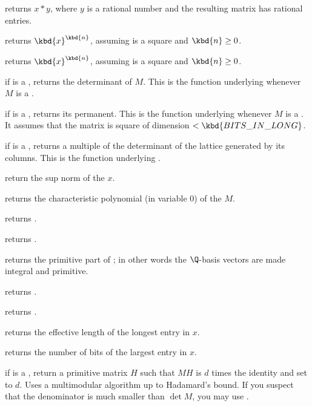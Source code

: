  returns $x*y$, where $y$ is a rational number
and the resulting matrix has rational entries.

 returns $\kbd{x}^\kbd{n}$, assuming 
is a square  and $\kbd{n}\geq 0$.

 returns $\kbd{x}^\kbd{n}$, assuming 
is a square  and $\kbd{n}\geq 0$.

 if  is a , returns the determinant of
$M$. This is the function underlying  whenever $M$ is a .

 if  is a , returns its
permanent. This is the function underlying  whenever $M$
is a . It assumes that the matrix is square of dimension $<
\kbd{BITS\_IN\_LONG}$.

 if  is a , returns a multiple of
the determinant of the lattice generated by its columns. This is the function
underlying .

 return the sup norm of the  $x$.

 returns the characteristic polynomial (in
variable $0$) of the  $M$.

 returns .

 returns .

 returns the primitive part of ; in
other words the $\Q$-basis vectors are made integral and primitive.

 returns .

 returns .

 returns the effective length of the longest
entry in $x$.

 returns the number of bits of the largest
entry in $x$.

 if  is a , return
a primitive matrix $H$ such that $M H$ is $d$ times the identity
and set  to $d$. Uses a multimodular algorithm up to Hadamard's bound.
If you suspect that the denominator is much smaller than $\det M$, you may
use .

